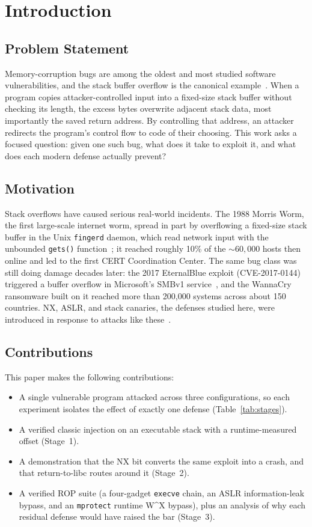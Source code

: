 \documentclass[10pt,twocolumn,letterpaper]{article}
\newcommand{\code}[1]{\texttt{\small #1}}
\begin{document}
\section{Introduction}

\subsection{Problem Statement}
Memory-corruption bugs are among the oldest and most studied software
vulnerabilities, and the stack buffer overflow is the canonical
example~\cite{alephone}. When a program copies attacker-controlled input into a
fixed-size stack buffer without checking its length, the excess bytes overwrite
adjacent stack data, most importantly the saved return address. By controlling
that address, an attacker redirects the program's control flow to code of their
choosing. This work asks a focused question: given one such bug, what does it
take to exploit it, and what does each modern defense actually prevent?

\subsection{Motivation}
Stack overflows have caused serious real-world incidents. The 1988 Morris Worm,
the first large-scale internet worm, spread in part by overflowing a fixed-size
stack buffer in the Unix \code{fingerd} daemon, which read network input with
the unbounded \code{gets()} function~\cite{alephone}; it reached roughly 10\% of
the ${\sim}60{,}000$ hosts then online and led to the first CERT Coordination
Center. The same bug class was still doing damage decades later: the 2017
EternalBlue exploit (CVE-2017-0144) triggered a buffer overflow in Microsoft's
SMBv1 service~\cite{cve}, and the WannaCry ransomware built on it reached more
than 200{,}000 systems across about 150 countries. NX, ASLR, and stack
canaries, the defenses studied here, were introduced in response to attacks
like these~\cite{pax,stackguard}.

\subsection{Contributions}
This paper makes the following contributions:
\begin{itemize}
  \item A single vulnerable program attacked across three configurations, so
    each experiment isolates the effect of exactly one defense (Table~\ref{tab:stages}).
  \item A verified classic injection on an executable stack with a
    runtime-measured offset (Stage~1).
  \item A demonstration that the NX bit converts the same exploit into a crash,
    and that return-to-libc routes around it (Stage~2).
  \item A verified ROP suite (a four-gadget \code{execve} chain, an ASLR
    information-leak bypass, and an \code{mprotect} runtime W\^{}X bypass), plus
    an analysis of why each residual defense would have raised the bar (Stage~3).
\end{itemize}
\end{document}
